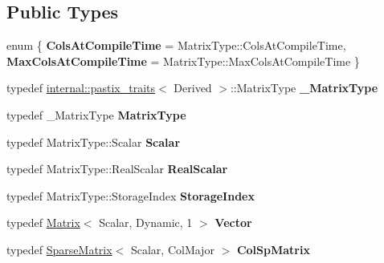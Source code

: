 \subsection*{Public Types}
\begin{DoxyCompactItemize}
\item 
\mbox{\label{class_eigen_1_1_pastix_base_a8888668dd77e179aae0e41b978158eed}} 
enum \{ {\bfseries Cols\+At\+Compile\+Time} = Matrix\+Type\+::Cols\+At\+Compile\+Time, 
{\bfseries Max\+Cols\+At\+Compile\+Time} = Matrix\+Type\+::Max\+Cols\+At\+Compile\+Time
 \}
\item 
\mbox{\label{class_eigen_1_1_pastix_base_a3590da53cc9d964ebc0e7c1ef62860d5}} 
typedef \mbox{\hyperlink{struct_eigen_1_1internal_1_1pastix__traits}{internal\+::pastix\+\_\+traits}}$<$ Derived $>$\+::Matrix\+Type {\bfseries \+\_\+\+Matrix\+Type}
\item 
\mbox{\label{class_eigen_1_1_pastix_base_a6cd35cdf1999768f6d99465b466f6afd}} 
typedef \+\_\+\+Matrix\+Type {\bfseries Matrix\+Type}
\item 
\mbox{\label{class_eigen_1_1_pastix_base_a9f25544947ef1a53a24b60103e3971e0}} 
typedef Matrix\+Type\+::\+Scalar {\bfseries Scalar}
\item 
\mbox{\label{class_eigen_1_1_pastix_base_a3a5f114fdba041a4c588e0034eb989a5}} 
typedef Matrix\+Type\+::\+Real\+Scalar {\bfseries Real\+Scalar}
\item 
\mbox{\label{class_eigen_1_1_pastix_base_a2e10075626ec849c47c2360653e1a89d}} 
typedef Matrix\+Type\+::\+Storage\+Index {\bfseries Storage\+Index}
\item 
\mbox{\label{class_eigen_1_1_pastix_base_aabb830048edd554f4fbcadd85408d9ab}} 
typedef \mbox{\hyperlink{class_eigen_1_1_matrix}{Matrix}}$<$ Scalar, Dynamic, 1 $>$ {\bfseries Vector}
\item 
\mbox{\label{class_eigen_1_1_pastix_base_ae6d77f933f8777a77197ead483dbb4cf}} 
typedef \mbox{\hyperlink{class_eigen_1_1_sparse_matrix}{Sparse\+Matrix}}$<$ Scalar, Col\+Major $>$ {\bfseries Col\+Sp\+Matrix}
\end{DoxyCompactItemize}
